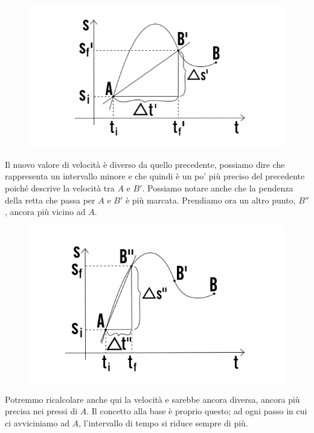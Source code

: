 \documentclass[11pt]{article}
\begin{document}
\begin{figure}[H]
\label{veloIst2}
\includegraphics[scale=0.7]{velox_ist_2.png}
\centering
\end{figure}

Il nuovo valore di velocità è diverso da quello precedente, possiamo dire che rappresenta un intervallo minore e che quindi è un po' più preciso del precedente poiché descrive la velocità tra $A$ e $B'$. Possiamo notare anche che la pendenza della retta che passa per $A$ e $B'$ è più marcata.
Prendiamo ora un altro punto, $B''$, ancora più vicino ad $A$.
 \begin{figure}[H]
 \label{veloIst3}
 \includegraphics[scale=0.7]{velox_ist_3.png}
 \centering
 \end{figure}

Potremmo ricalcolare anche qui la velocità e sarebbe ancora diversa, ancora più precisa nei pressi di $A$. Il concetto alla base è proprio questo; ad ogni passo in cui ci avviciniamo ad $A$, l'intervallo di tempo si riduce sempre di più. 
\end{document}
